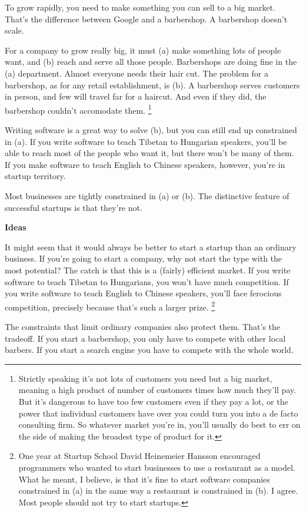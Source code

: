 \documentclass[12pt]{book}
\begin{document}
To grow rapidly, you need to make something you can sell to a big
market. That's the difference between Google and a barbershop. A
barbershop doesn't scale.

For a company to grow really big, it must (a) make something lots of
people want, and (b) reach and serve all those people. Barbershops are
doing fine in the (a) department. Almost everyone needs their hair cut.
The problem for a barbershop, as for any retail establishment, is (b). A
barbershop serves customers in person, and few will travel far for a
haircut. And even if they did, the barbershop couldn't accomodate them.
\footnote{Strictly speaking it's not lots of customers you need but a big
market, meaning a high product of number of customers times how much
they'll pay. But it's dangerous to have too few customers even if they
pay a lot, or the power that individual customers have over you could
turn you into a de facto consulting firm. So whatever market you're in,
you'll usually do best to err on the side of making the broadest type of
product for it.}

Writing software is a great way to solve (b), but you can still end up
constrained in (a). If you write software to teach Tibetan to Hungarian
speakers, you'll be able to reach most of the people who want it, but
there won't be many of them. If you make software to teach English to
Chinese speakers, however, you're in startup territory.

Most businesses are tightly constrained in (a) or (b). The distinctive
feature of successful startups is that they're not.

\textbf{Ideas}

It might seem that it would always be better to start a startup than an
ordinary business. If you're going to start a company, why not start the
type with the most potential? The catch is that this is a (fairly)
efficient market. If you write software to teach Tibetan to Hungarians,
you won't have much competition. If you write software to teach English
to Chinese speakers, you'll face ferocious competition, precisely
because that's such a larger prize. \footnote{One year at Startup School David Heinemeier Hansson encouraged
programmers who wanted to start businesses to use a restaurant as a
model. What he meant, I believe, is that it's fine to start software
companies constrained in (a) in the same way a restaurant is constrained
in (b). I agree. Most people should not try to start startups.}

The constraints that limit ordinary companies also protect them. That's
the tradeoff. If you start a barbershop, you only have to compete with
other local barbers. If you start a search engine you have to compete
with the whole world.
\end{document}
